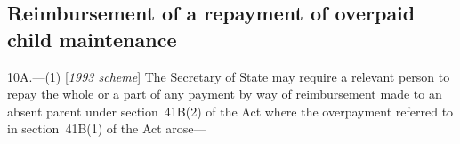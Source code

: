 \documentclass[12pt,a4paper]{article}
\begin{document}
%
%
%
%

\subsection[10A. Reimbursement of a repayment of overpaid child maintenance]{Reimbursement of a repayment of overpaid child maintenance}

10A.—(1) [\emph{1993 scheme}] The Secretary of State may require a relevant person to repay the whole or a part of any payment by way of reimbursement made to an absent parent under section~41B(2) of the Act where the overpayment referred to in section~41B(1) of the Act arose—
\end{document}
